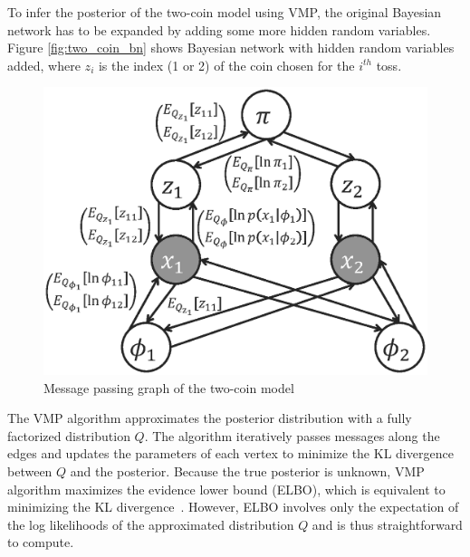 To infer the posterior of the two-coin model using VMP,
the original Bayesian network has to be expanded by 
adding some more hidden random variables.
Figure \ref{fig:two_coin_bn}
shows Bayesian network with hidden random variables added,
where $z_i$ is the index (1 or 2) of the coin chosen for the $i^{th}$ toss.


%

\begin{figure}[ht]
	\centering
	\includegraphics[scale=0.4]{figs/two_coins_mpg.eps}
	\caption{Message passing graph of the two-coin model}
	\label{fig:two_coins_mpg}
\end{figure}

The VMP algorithm approximates the posterior distribution with a fully
factorized distribution $Q$. 
The algorithm iteratively passes messages along
the edges and updates the parameters of each vertex to minimize the KL divergence
between $Q$ and the posterior.  
Because the true posterior is unknown, VMP algorithm maximizes the
evidence lower bound (ELBO), which is equivalent to minimizing the KL
divergence~\cite{vmp}. However, ELBO involves only the expectation 
of the log likelihoods of the approximated distribution $Q$ and 
is thus straightforward to compute. 

